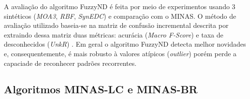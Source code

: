 
A avaliação do algoritmo FuzzyND é feita por meio de experimentos usando 3 
\datasets sintéticos (\emph{MOA3}, \emph{RBF}, \emph{SynEDC})
e comparação com o MINAS.
O método de avaliação utilizado baseia-se na matriz de confusão incremental
descrita por  extraindo dessa matriz duas métricas:
acurácia (\emph{Macro F-Score}) \cite{Sokolova2009} e
taxa de desconhecidos (\emph{UnkR}) \cite{Faria2016minas}.
Em geral o algoritmo FuzzyND detecta melhor novidades e, consequentemente,
é mais robusto à valores atípicos (\emph{outlier}) porém perde a capaciade
de reconhecer padrões recorrentes.



\subsection*{Algoritmos MINAS-LC e MINAS-BR}

